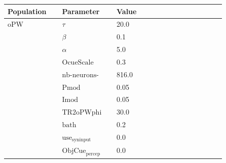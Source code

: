 \documentclass{article}
\begin{document}
\vspace{2ex}

\noindent
\begin{tabularx}{\linewidth}{|p{0.25\linewidth}|p{0.25\linewidth}|X|}\hline
\textbf{Population} & \textbf{Parameter} & \textbf{Value}   \\ \hline

    oPW             & $\tau$        & 20.0  \\ \hline

                 & $\beta$        & 0.1  \\ \hline

                 & $\alpha$        & 5.0  \\ \hline

                 & ${\text{OcueScale}}$        & 0.3  \\ \hline

                 & ${\text{nb-neurons-oPW}}$        & 816.0  \\ \hline

                 & ${\text{Pmod}}$        & 0.05  \\ \hline

                 & ${\text{Imod}}$        & 0.05  \\ \hline

                 & ${\text{TR2oPWphi}}$        & 30.0  \\ \hline

                 & ${\text{bath}}$        & 0.2  \\ \hline

                 & ${\text{use}}_{\text{syninput}}$        & 0.0  \\ \hline

                 & ${\text{ObjCue}}_{\text{percep}}$        & 0.0  \\ \hline

\end{tabularx}

\vspace{2ex}
\end{document}
